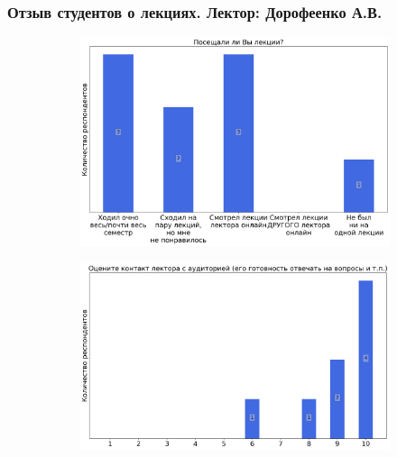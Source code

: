 	\subsubsection{Отзыв студентов о лекциях. Лектор: Дорофеенко А.В.}

		\begin{figure}[H]
			\centering
            \begin{subfigure}[b]{0.45\textwidth}
				\centering
				\includegraphics[width=\textwidth]{images/4 course/Квантовая механика/lecturer-questions-Дорофеенко А.В.-0.png}
			\end{subfigure}
			\begin{subfigure}[b]{0.45\textwidth}
				\centering
				\includegraphics[width=\textwidth]{images/4 course/Квантовая механика/lecturer-marks-Дорофеенко А.В.-0.png}
			\end{subfigure}
			\begin{subfigure}[b]{0.45\textwidth}
				\centering

\end{subfigure}
\end{figure}
